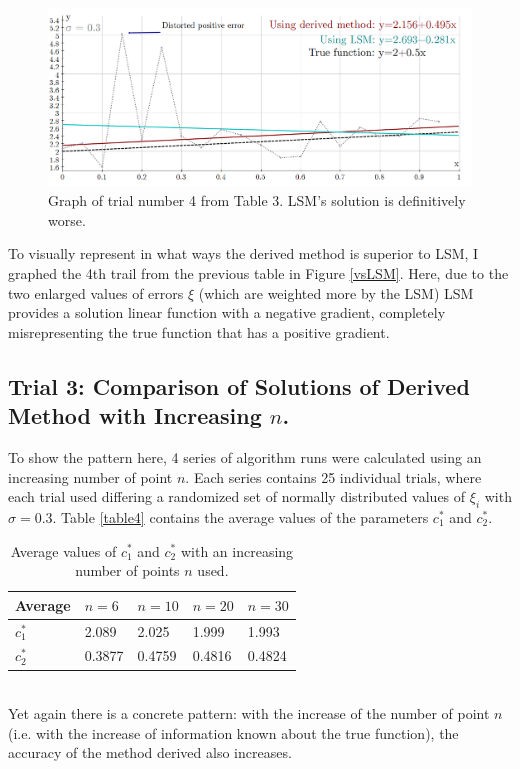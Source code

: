 \begin{figure}[H]
\caption{Graph of trial number 4 from Table 3. LSM's solution is definitively worse.}
\label{vsLSM}
\includegraphics[scale=0.35]{updated/table-2}
\centering
\end{figure}
To visually represent in what ways the derived method is superior to LSM, I graphed the 4th trail from the previous table in Figure \vref{vsLSM}. Here, due to the two enlarged values of errors $\xi$ (which are weighted more by the LSM) LSM provides a solution linear function with a negative gradient, completely misrepresenting the true function that has a positive gradient. 
\subsection{Trial 3: Comparison of Solutions of Derived Method with Increasing $n$.}
To show the pattern here, 4 series of algorithm runs were calculated using an increasing number of point $n$. Each series contains 25 individual trials, where each trial used differing a randomized set of normally distributed values of $\xi_i$ with $\sigma=0.3$. Table \vref{table4} contains the average values of the parameters $c^*_1$ and $c^*_2$.
\begin{table}[!h]
\centering
\caption{Average values of $c^*_1$ and $c^*_2$ with an increasing number of points $n$ used.}
\label{table4}
\bgroup
\def\arraystretch{1.3}
\begin{tabular}{|l|l|l|l|l|}
\hline
Average & $n=6$  & $n=10$ & $n=20$ & $n=30$ \\ \hline
$c_1^*$ & 2.089  & 2.025  & 1.999  & 1.993  \\ \cline{1-1}
$c_2^*$ & 0.3877 & 0.4759 & 0.4816 & 0.4824 \\ \hline
\end{tabular} 
\egroup
\end{table}
\\
Yet again there is a concrete pattern: with the increase of the number of point $n$ (i.e. with the increase of information known about the true function), the accuracy of the method derived also increases.

